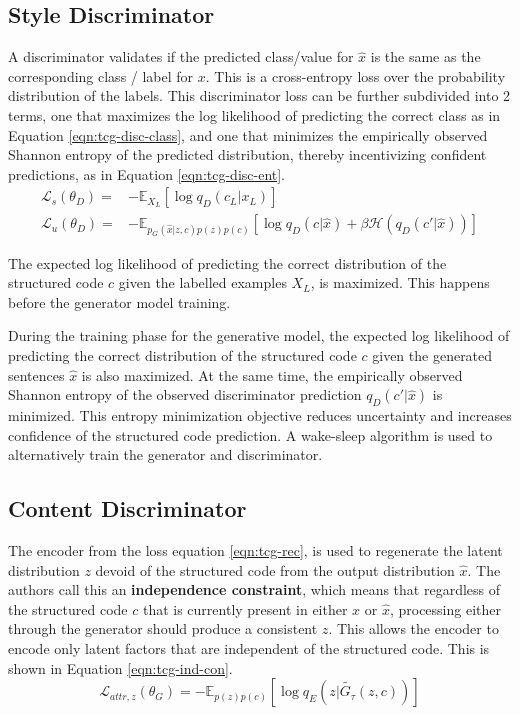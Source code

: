 \subsection{Style Discriminator}

A discriminator validates if the predicted class/value for $\hat{x}$ is the same as the corresponding class / label for $x$. This is a cross-entropy loss over the probability distribution of the labels. This discriminator loss can be further subdivided into 2 terms, one that maximizes the log likelihood of predicting the correct class as in Equation \ref{eqn:tcg-disc-class}, and one that minimizes the empirically observed Shannon entropy of the predicted distribution, thereby incentivizing confident predictions, as in Equation \ref{eqn:tcg-disc-ent}.
\begin{align}
	\label{eqn:tcg-disc-class}
	\mathcal{L}_s(\theta_D) = & - \mathbb{E}_{X_L}[\log q_D(c_L|x_L)]   \\
	\label{eqn:tcg-disc-ent}
	\mathcal{L}_u(\theta_D) = & - \mathbb{E}_{p_G(\hat{x}|z,c)p(z)p(c)}
	[\log q_D(c|\hat{x}) + \beta \mathcal{H}(q_D(c'|\hat{x}))]
\end{align}

The expected log likelihood of predicting the correct distribution of the structured code $c$ given the labelled examples $X_L$, is maximized. This happens before the generator model training.

During the training phase for the generative model, the expected log likelihood of predicting the correct distribution of the structured code $c$ given the generated sentences $\hat{x}$ is also maximized. At the same time, the empirically observed Shannon entropy of the observed discriminator prediction $q_D(c'|\hat{x})$ is minimized. This entropy minimization objective reduces uncertainty and increases confidence of the structured code prediction. A wake-sleep algorithm \citep{hinton1995wake} is used to alternatively train the generator and discriminator.

\subsection{Content Discriminator}

The encoder from the loss equation \ref{eqn:tcg-rec}, is used to regenerate the latent distribution $z$ devoid of the structured code from the output distribution $\hat{x}$. The authors call this an \textbf{independence constraint}, which means that regardless of the structured code $c$ that is currently present in either $x$ or $\hat{x}$, processing either through the generator should produce a consistent $z$. This allows the encoder to encode only latent factors that are independent of the structured code. This is shown in Equation \ref{eqn:tcg-ind-con}.
\begin{equation} \label{eqn:tcg-ind-con}
	\mathcal{L}_{attr, z}(\theta_G) = - \mathbb{E}_{p(z)p(c)}
	[\log q_E(z|\tilde{G_{\tau}}(z,c))]
\end{equation}


